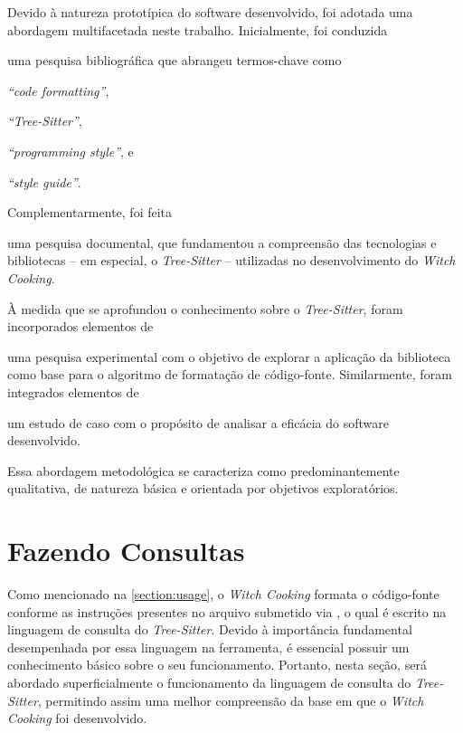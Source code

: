 \documentclass
  [11pt,a4paper,english,brazil,openright,sumario=tradicional,twoside]
  {abntex2}
\newcommand{\treesitter}{\textit{Tree-Sitter}\xspace}
\newcommand{\witchcooking}{\textit{Witch Cooking}\xspace}
\begin{document}
  Devido à natureza prototípica do software desenvolvido, foi adotada uma
  abordagem multifacetada neste trabalho. Inicialmente, foi conduzida
  \begin{inparaenum}
    \item uma pesquisa bibliográfica que abrangeu termos-chave como
          \begin{inparaenum}
            \item \textit{``code formatting''},
            \item \textit{``Tree-Sitter''},
            \item \textit{``programming style''}, e
            \item \textit{``style guide''}.
          \end{inparaenum}
          Complementarmente, foi feita
    \item uma pesquisa documental, que fundamentou a compreensão das
          tecnologias e bibliotecas -- em especial, o \treesitter{} --
          utilizadas no desenvolvimento do \witchcooking.

          À medida que se aprofundou o conhecimento sobre o \treesitter, foram
          incorporados elementos de
    \item uma pesquisa experimental com o objetivo de explorar a aplicação da
          biblioteca como base para o algoritmo de formatação de código-fonte.
          Similarmente, foram integrados elementos de
    \item um estudo de caso com o propósito de analisar a eficácia do software
          desenvolvido.
  \end{inparaenum}
  Essa abordagem metodológica se caracteriza como predominantemente
  qualitativa, de natureza básica e orientada por objetivos exploratórios.


  \section{Fazendo Consultas}

  Como mencionado na \cref{section:usage}, o \witchcooking formata o
  código-fonte conforme as instruções presentes no arquivo submetido via
  , o qual é escrito na linguagem de consulta do
  \treesitter. Devido à importância fundamental desempenhada por essa linguagem
  na ferramenta, é essencial possuir um conhecimento básico sobre o seu
  funcionamento. Portanto, nesta seção, será abordado superficialmente o
  funcionamento da linguagem de consulta do \treesitter, permitindo assim uma
  melhor compreensão da base em que o \witchcooking foi desenvolvido.
\end{document}
